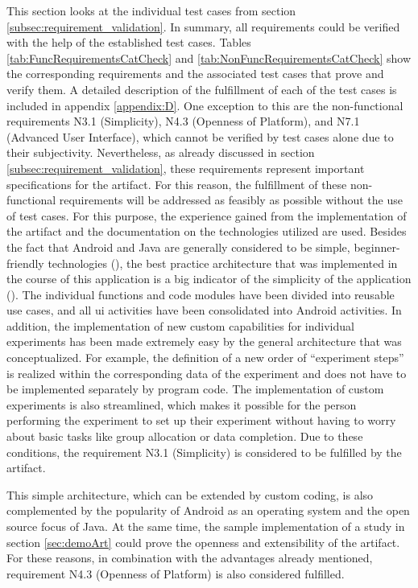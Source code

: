 This section looks at the individual test cases from section \ref{subsec:requirement_validation}. In summary, all requirements could be verified with the help of the established test cases. Tables \ref{tab:FuncRequirementsCatCheck} and \ref{tab:NonFuncRequirementsCatCheck} show the corresponding requirements and the associated test cases that prove and verify them. A detailed description of the fulfillment of each of the test cases is included in appendix \ref{appendix:D}. One exception to this are the non-functional requirements N3.1 (Simplicity), N4.3 (Openness of Platform), and N7.1 (Advanced User Interface), which cannot be verified by test cases alone due to their subjectivity. Nevertheless, as already discussed in section \ref{subsec:requirement_validation}, these requirements represent important specifications for the artifact. For this reason, the fulfillment of these non-functional requirements will be addressed as feasibly as possible without the use of test cases. For this purpose, the experience gained from the implementation of the artifact and the documentation on the technologies utilized are used. Besides the fact that Android and Java are generally considered to be simple, beginner-friendly technologies (\cite{Ullenboom.2017}), the best practice architecture that was implemented in the course of this application is a big indicator of the simplicity of the application (\cite{Google.2023}). The individual functions and code modules have been divided into reusable use cases, and all \ac{ui} activities have been consolidated into Android activities. In addition, the implementation of new custom capabilities for individual experiments has been made extremely easy by the general architecture that was conceptualized. For example, the definition of a new order of \enquote{experiment steps} is realized within the corresponding data of the experiment and does not have to be implemented separately by program code. The implementation of custom experiments is also streamlined, which makes it possible for the person performing the experiment to set up their experiment without having to worry about basic tasks like group allocation or data completion. Due to these conditions, the requirement N3.1 (Simplicity) is considered to be fulfilled by the artifact.

This simple architecture, which can be extended by custom coding, is also complemented by the popularity of Android as an operating system and the open source focus of Java. At the same time, the sample implementation of a study in section \ref{sec:demoArt} could prove the openness and extensibility of the artifact. For these reasons, in combination with the advantages already mentioned, requirement N4.3 (Openness of Platform) is also considered fulfilled. 


